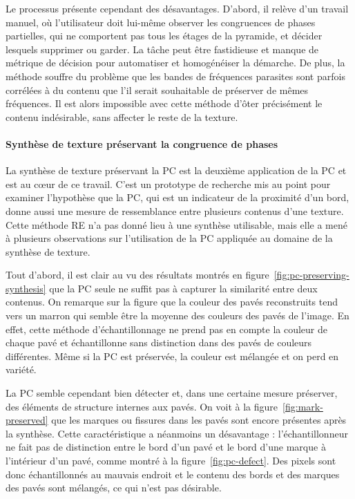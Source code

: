 \bigskip

Le processus présente cependant des désavantages. D'abord, il relève d'un travail manuel, où l'utilisateur doit lui-même observer les congruences de phases partielles, qui ne comportent pas tous les étages de la pyramide, et décider lesquels supprimer ou garder. La tâche peut être fastidieuse et manque de métrique de décision pour automatiser et homogénéiser la démarche. De plus, la méthode souffre du problème que les bandes de fréquences parasites sont parfois corrélées à du contenu que l'il serait souhaitable de préserver de mêmes fréquences. Il est alors impossible avec cette méthode d'ôter précisément le contenu indésirable, sans affecter le reste de la texture.

\paragraph{Synthèse de texture préservant la congruence de phases}
\label{par:discussion-synthesis}

La synthèse de texture préservant la PC est la deuxième application de la PC et est au cœur de ce travail. C'est un prototype de recherche mis au point pour examiner l'hypothèse que la PC, qui est un indicateur de la proximité d'un bord, donne aussi une mesure de ressemblance entre plusieurs contenus d'une texture. Cette méthode RE n'a pas donné lieu à une synthèse utilisable, mais elle a mené à plusieurs observations sur l'utilisation de la PC appliquée au domaine de la synthèse de texture.

\bigskip

Tout d'abord, il est clair au vu des résultats montrés en figure~\ref{fig:pc-preserving-synthesis} que la PC seule ne suffit pas à capturer la similarité entre deux contenus. On remarque sur la figure que la couleur des pavés reconstruits tend vers un marron qui semble être la moyenne des couleurs des pavés de l'image. En effet, cette méthode d'échantillonnage ne prend pas en compte la couleur de chaque pavé et échantillonne sans distinction dans des pavés de couleurs différentes. Même si la PC est préservée, la couleur est mélangée et on perd en variété.

\bigskip

La PC semble cependant bien détecter et, dans une certaine mesure préserver, des éléments de structure internes aux pavés. On voit à la figure~\ref{fig:mark-preserved} que les marques ou fissures dans les pavés sont encore présentes après la synthèse. Cette caractéristique a néanmoins un désavantage : l'échantillonneur ne fait pas de distinction entre le bord d'un pavé et le bord d'une marque à l'intérieur d'un pavé, comme montré à la figure~\ref{fig:pc-defect}. Des pixels sont donc échantillonnés au mauvais endroit et le contenu des bords et des marques des pavés sont mélangés, ce qui n'est pas désirable.

